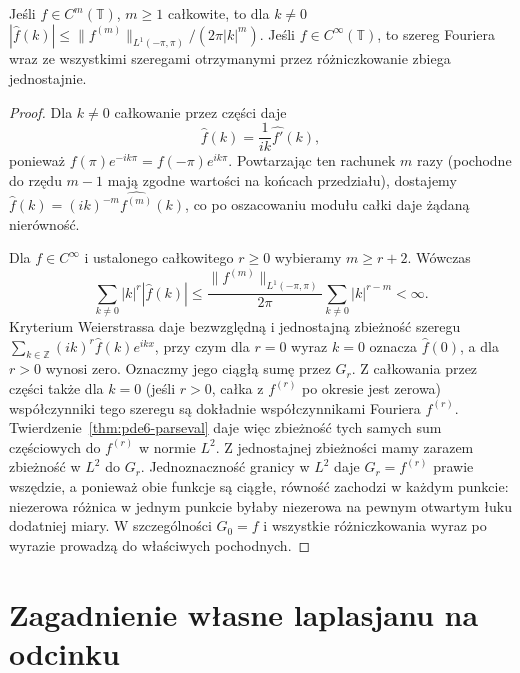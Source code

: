 \begin{lemat}
\label{lem:pde6-decay}
Jeśli $f\in C^m(\mathbb T)$, $m\geq1$ całkowite, to dla $k\ne0$
$|\widehat f(k)|\le\|f^{(m)}\|_{L^1(-\pi,\pi)}/(2\pi|k|^m)$.
Jeśli $f\in C^\infty(\mathbb T)$, to szereg Fouriera wraz
ze wszystkimi szeregami otrzymanymi przez różniczkowanie
zbiega jednostajnie.
\end{lemat}
\begin{proof}
Dla $k\ne0$ całkowanie przez części daje
\[
 \widehat f(k)=\frac1{ik}\widehat{f'}(k),
\]
ponieważ $f(\pi)e^{-ik\pi}=f(-\pi)e^{ik\pi}$.
Powtarzając ten rachunek $m$ razy (pochodne
do rzędu $m-1$ mają zgodne wartości na końcach
przedziału), dostajemy
$\widehat f(k)=(ik)^{-m}\widehat{f^{(m)}}(k)$,
co po oszacowaniu modułu całki daje żądaną nierówność.

Dla $f\in C^\infty$ i ustalonego całkowitego
$r\geq0$ wybieramy $m\geq r+2$. Wówczas
\[
 \sum_{k\ne0}|k|^r|\widehat f(k)|
 \leq\frac{\|f^{(m)}\|_{L^1(-\pi,\pi)}}{2\pi}
 \sum_{k\ne0}|k|^{r-m}<\infty.
\]
Kryterium Weierstrassa daje bezwzględną
i jednostajną zbieżność szeregu
$\sum_{k\in\mathbb Z}(ik)^r\widehat f(k)e^{ikx}$,
przy czym dla $r=0$ wyraz $k=0$ oznacza
$\widehat f(0)$, a dla $r>0$ wynosi zero.
Oznaczmy jego ciągłą sumę przez $G_r$.
Z całkowania przez części także dla $k=0$
(jeśli $r>0$, całka z $f^{(r)}$ po okresie
jest zerowa) współczynniki tego szeregu
są dokładnie współczynnikami Fouriera $f^{(r)}$.
Twierdzenie~\ref{thm:pde6-parseval} daje więc
zbieżność tych samych sum częściowych do $f^{(r)}$
w normie $L^2$. Z jednostajnej zbieżności
mamy zarazem zbieżność w $L^2$ do $G_r$.
Jednoznaczność granicy w $L^2$ daje
$G_r=f^{(r)}$ prawie wszędzie, a ponieważ
obie funkcje są ciągłe, równość zachodzi
w każdym punkcie: niezerowa różnica
w jednym punkcie byłaby niezerowa na
pewnym otwartym łuku dodatniej miary.
W szczególności $G_0=f$ i wszystkie
różniczkowania wyraz po wyrazie prowadzą
do właściwych pochodnych.
\end{proof}

\section{Zagadnienie własne laplasjanu na odcinku}
\label{sec:pde6-dirichlet}

